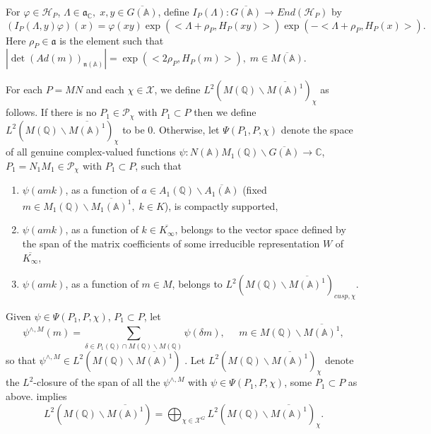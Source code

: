 For $\varphi \in {\mathcal H}_P$,
$\Lambda \in {\mathfrak{a}}_{{\mathbb C}},\;x,y\in \overline{G({\mathbb{A}})}$,
define $I_P(\Lambda ):\overline{G({\mathbb{A}})}\rightarrow End({\mathcal H}_P)$ by 
\[
(I_P(\Lambda ,y)\varphi )(x)=\varphi (xy)\exp (<\Lambda +\rho
_P,H_P(xy)>)\exp (-<\Lambda +\rho _P,H_P(x)>). 
\]
Here $\rho _P\in {\mathfrak{a}}$ is the element such that
$|\det (Ad(m))_{{\mathfrak{n}}({\mathbb A})}|
=\exp (<2\rho _P,H_P(m)>),\;m\in \overline{M({\mathbb{A}})}$.

For each $P=MN$ and each $\chi \in {\mathcal X}$, we define
$L^2(M({\mathbb{Q}})\backslash \overline{M({\mathbb{A}})^1})_\chi $
as follows. If there is no $P_1\in {\mathcal P}_\chi $
with $P_1\subset P$ then we define
$L^2(M({{\mathbb{Q}}})\backslash \overline{M({\mathbb{A}})^1})_\chi $
to be $0$. Otherwise, let $\Psi (P_1,P,\chi )$ denote the space of
all genuine complex-valued functions
$\psi :N({\mathbb{A}})M_1({\mathbb{Q}})\backslash \overline{G({\mathbb{A}})}
\rightarrow {\mathbb C}$, $P_1=N_1M_1\in {\mathcal{P}}_\chi $ 
with $P_1\subset P$, such that

\begin{enumerate}
\item  $\psi (amk)$, as a function of 
$a\in A_1({\mathbb{Q}})\backslash \overline{A_1({\mathbb{A}})}$ (fixed 
$m\in M_1({\mathbb{Q}})\backslash \overline{M_1({\mathbb{A}})^1},\;k\in K$),
is compactly supported,

\item  $\psi (amk)$, as a function of $k\in \overline{K_\infty}$,
belongs to the
vector space defined by the span of the matrix coefficients of some
irreducible representation $W$ of $\overline{K_\infty}$,

\item  $\psi (amk)$, as a function of $m\in M$, belongs to 
$L^2(M({{\mathbb{Q}}})\backslash \overline{M({\mathbb{A}})^1})_{cusp,\chi }$.
\end{enumerate}

Given $\psi \in \Psi (P_1,P,\chi )$, $P_1\subset P$, let 
\[
\psi ^{\wedge ,M}(m)=
\sum_{\delta \in P_1({\mathbb{Q}})\cap
M({\mathbb{Q}})\backslash M({\mathbb{Q}})}
\psi (\delta m),\;\;\;\;\;
m\in M({\mathbb{Q}})\backslash \overline{M({\mathbb{A}})^1}, 
\]
so that
$\psi ^{\wedge ,M}\in
L^2(M({\mathbb{Q}})\backslash \overline{M({\mathbb{A}})^1})$
\cite[Lemma 1]{L1}. Let
$L^2(M({\mathbb{Q}})\backslash \overline{M({\mathbb{A}})^1})_\chi $ denote
the $L^2$-closure of the span of all the
$\psi ^{\wedge ,M}$ with $\psi \in \Psi (P_1,P,\chi )$,
some $P_1\subset P$ as above. \cite[Lemma 2]{L1} implies 
\begin{equation}\label{eq:5.4}
L^2(M({\mathbb{Q}})\backslash \overline{M({\mathbb{A}})^1})
=\bigoplus_{\chi \in {\mathcal X}^G}
L^2(M({\mathbb{Q}})\backslash \overline{M({\mathbb{A}})^1})_\chi .
\end{equation}

